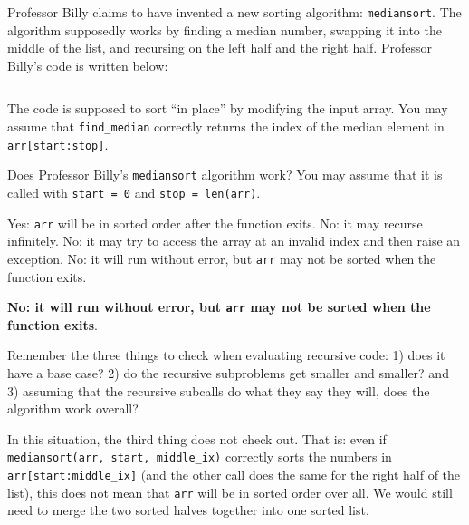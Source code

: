 \begin{prob}
    Professor Billy claims to have invented a new sorting algorithm:
    \texttt{mediansort}. The algorithm supposedly works by finding a median
    number, swapping it into the middle of the list, and recursing on the left
    half and the right half. Professor Billy's code is written below:

    \inputminted[lastline=18]{python}{code.py}

    The code is supposed to sort ``in place'' by modifying the input array.
    You may assume that \texttt{find_median} correctly returns the index
    of the median element in \texttt{arr[start:stop]}.

    Does Professor Billy's \texttt{mediansort} algorithm work? You may assume that it is called
    with \texttt{start = 0} and \texttt{stop = len(arr)}.

    \begin{choices}
        \choice Yes: \texttt{arr} will be in sorted order after the function exits.
        \choice No: it may recurse infinitely.
        \choice No: it may try to access the array at an invalid index and then raise an exception.
        \correctchoice No: it will run without error, but \texttt{arr} may not be sorted when the function exits.
    \end{choices}

    \begin{soln}

        \textbf{No: it will run without error, but \texttt{arr} may not be sorted 
        when the function exits}.


        Remember the three things to check when evaluating recursive code: 1)
        does it have a base case? 2) do the recursive subproblems get smaller
        and smaller? and 3) assuming that the recursive subcalls do what they say
        they will, does the algorithm work overall?

        In this situation, the third thing does not check out. That is: even if
        \texttt{mediansort(arr, start, middle_ix)} correctly sorts the numbers
        in \texttt{arr[start:middle_ix]} (and the other call does the same for
        the right half of the list), this does not mean that \texttt{arr} will
        be in sorted order over all. We would still need to merge the two
        sorted halves together into one sorted list.


\end{soln}
\end{prob}
